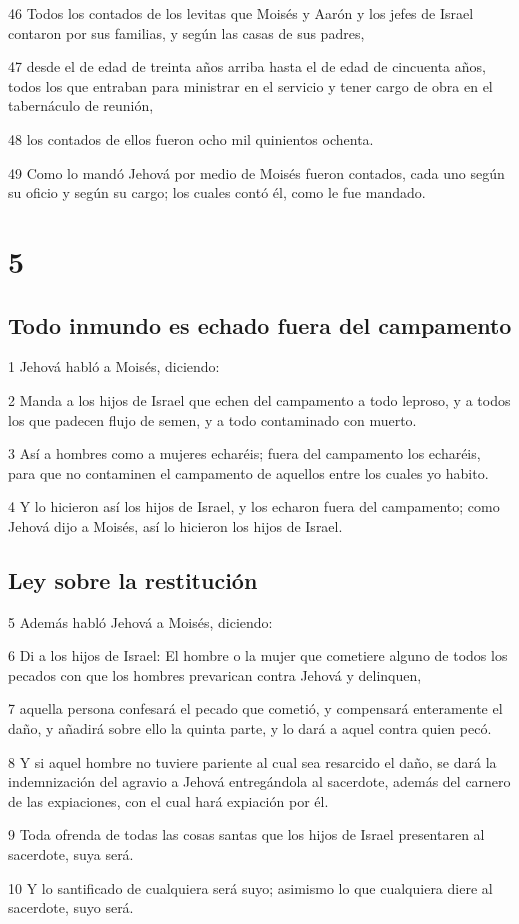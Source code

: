 \par 46 Todos los contados de los levitas que Moisés y Aarón y los jefes de Israel contaron por sus familias, y según las casas de sus padres,
\par 47 desde el de edad de treinta años arriba hasta el de edad de cincuenta años, todos los que entraban para ministrar en el servicio y tener cargo de obra en el tabernáculo de reunión,
\par 48 los contados de ellos fueron ocho mil quinientos ochenta.
\par 49 Como lo mandó Jehová por medio de Moisés fueron contados, cada uno según su oficio y según su cargo; los cuales contó él, como le fue mandado.

\chapter{5}

\section*{Todo inmundo es echado fuera del campamento}

\par 1 Jehová habló a Moisés, diciendo:
\par 2 Manda a los hijos de Israel que echen del campamento a todo leproso, y a todos los que padecen flujo de semen, y a todo contaminado con muerto.
\par 3 Así a hombres como a mujeres echaréis; fuera del campamento los echaréis, para que no contaminen el campamento de aquellos entre los cuales yo habito.
\par 4 Y lo hicieron así los hijos de Israel, y los echaron fuera del campamento; como Jehová dijo a Moisés, así lo hicieron los hijos de Israel.

\section*{Ley sobre la restitución}

\par 5 Además habló Jehová a Moisés, diciendo:
\par 6 Di a los hijos de Israel: El hombre o la mujer que cometiere alguno de todos los pecados con que los hombres prevarican contra Jehová y delinquen,
\par 7 aquella persona confesará el pecado que cometió, y compensará enteramente el daño, y añadirá sobre ello la quinta parte, y lo dará a aquel contra quien pecó.
\par 8 Y si aquel hombre no tuviere pariente al cual sea resarcido el daño, se dará la indemnización del agravio a Jehová entregándola al sacerdote, además del carnero de las expiaciones, con el cual hará expiación por él. 
\par 9 Toda ofrenda de todas las cosas santas que los hijos de Israel presentaren al sacerdote, suya será.
\par 10 Y lo santificado de cualquiera será suyo; asimismo lo que cualquiera diere al sacerdote, suyo será.

